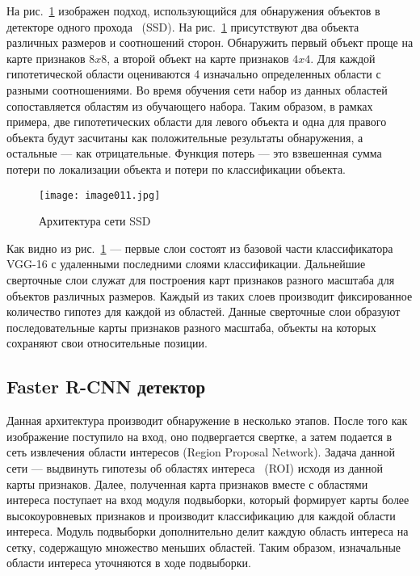 На рис.~\ref{fig:image011} изображен подход, использующийся для обнаружения объектов в детекторе одного прохода ~(SSD). На рис.~\ref{fig:image011} присутствуют два объекта различных размеров и соотношений сторон. Обнаружить первый объект проще на карте признаков \(8x8\), а второй объект на карте признаков \(4x4\). Для каждой гипотетической области оцениваются 4 изначально определенных области с разными соотношениями. Во время обучения сети набор из данных областей сопоставляется областям из обучающего набора. Таким образом, в рамках примера, две гипотетических области для левого объекта и одна для правого объекта будут засчитаны как положительные результаты обнаружения, а остальные — как отрицательные. Функция потерь — это взвешенная сумма потери по локализации объекта и потери по классификации объекта.

\begin{figure}[htbp]
\centering
\texttt{[image: image011.jpg]}
\caption{Архитектура сети SSD\cite{fourteen}}%
\label{fig:image011}
\end{figure}

Как видно из рис.~\ref{fig:image011} — первые слои состоят из базовой части классификатора VGG-16 с удаленными последними слоями классификации. Дальнейшие сверточные слои служат для построения карт признаков разного масштаба для объектов различных размеров. Каждый из таких слоев производит фиксированное количество гипотез для каждой из областей. Данные сверточные слои образуют последовательные карты признаков разного масштаба, объекты на которых сохраняют свои относительные позиции.

\subsection{Faster R-CNN детектор}

Данная архитектура производит обнаружение в несколько этапов. После того как изображение поступило на вход, оно подвергается свертке, а затем подается в сеть извлечения области интересов (Region Proposal Network). Задача данной сети — выдвинуть гипотезы об областях интереса ~(ROI) исходя из данной карты признаков. 
Далее, полученная карта признаков вместе с областями интереса поступает на вход модуля подвыборки, который формирует карты более высокоуровневых признаков и производит классификацию для каждой области интереса. Модуль подвыборки дополнительно делит каждую область интереса на сетку, содержащую множество меньших областей. Таким образом, изначальные области интереса уточняются в ходе подвыборки. 

